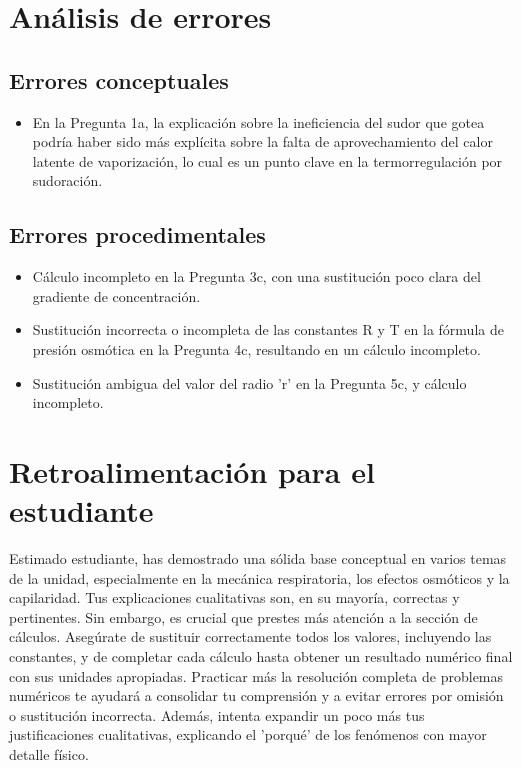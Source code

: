 \documentclass[11pt,a4paper]{article}
\begin{document}
\section*{Análisis de errores}

\subsection*{Errores conceptuales}
\begin{itemize}[leftmargin=1.5em, itemsep=2pt]
  \item En la Pregunta 1a, la explicación sobre la ineficiencia del sudor que gotea podría haber sido más explícita sobre la falta de aprovechamiento del calor latente de vaporización, lo cual es un punto clave en la termorregulación por sudoración.
\end{itemize}

\subsection*{Errores procedimentales}
\begin{itemize}[leftmargin=1.5em, itemsep=2pt]
  \item Cálculo incompleto en la Pregunta 3c, con una sustitución poco clara del gradiente de concentración.
  \item Sustitución incorrecta o incompleta de las constantes R y T en la fórmula de presión osmótica en la Pregunta 4c, resultando en un cálculo incompleto.
  \item Sustitución ambigua del valor del radio 'r' en la Pregunta 5c, y cálculo incompleto.
\end{itemize}

\section*{Retroalimentación para el estudiante}
\begin{tcolorbox}[cajaRecomendacion, title={Dirigido a: Deliangelis Inojosa}]
Estimado estudiante, has demostrado una sólida base conceptual en varios temas de la unidad, especialmente en la mecánica respiratoria, los efectos osmóticos y la capilaridad. Tus explicaciones cualitativas son, en su mayoría, correctas y pertinentes. Sin embargo, es crucial que prestes más atención a la sección de cálculos. Asegúrate de sustituir correctamente todos los valores, incluyendo las constantes, y de completar cada cálculo hasta obtener un resultado numérico final con sus unidades apropiadas. Practicar más la resolución completa de problemas numéricos te ayudará a consolidar tu comprensión y a evitar errores por omisión o sustitución incorrecta. Además, intenta expandir un poco más tus justificaciones cualitativas, explicando el 'porqué' de los fenómenos con mayor detalle físico.
\end{tcolorbox}
\end{document}
